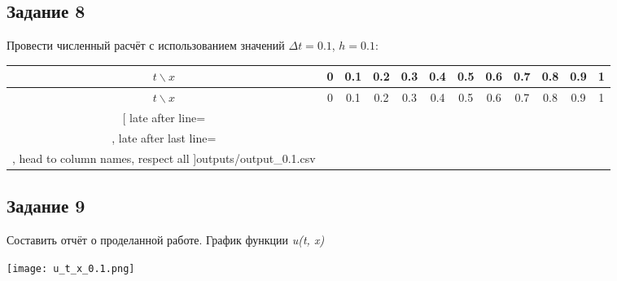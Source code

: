 \documentclass[12pt, a4paper]{report}
\begin{document}
	\subsection*{Задание 8}
	\large
	Провести численный расчёт с использованием значений $ \Delta t = 0.1$, $ h = 0.1 $:
		\begin{center}
	\small
	\label{tab:results_01}
		\begin{longtable}{|c|c|c|c|c|c|c|c|c|c|c|c|}
		\hline
		$t \backslash x$ & 0 & 0.1 & 0.2 & 0.3 & 0.4 & 0.5 & 0.6 & 0.7 & 0.8 & 0.9 & 1 \\\hline
		\endfirsthead

		\hline
		$t \backslash x$ & 0 & 0.1 & 0.2 & 0.3 & 0.4 & 0.5 & 0.6 & 0.7 & 0.8 & 0.9 & 1 \\\hline
		\endhead

		\hline
		\endfoot

		\csvreader[
		  late after line=\\,
		  late after last line=\\\hline,
		  head to column names,
		  respect all
		]{outputs/output_0.1.csv}{}{
		  \csvcoli & \csvcolii & \csvcoliii & \csvcoliv & \csvcolv & \csvcolvi & \csvcolvii & \csvcolviii & \csvcolix & \csvcolx & \csvcolxi & \csvcolxii
		}
		\end{longtable}
	\end{center}

	\subsection*{Задание 9}
	\large
	Составить отчёт о проделанной работе. График функции \textit{u(t, x)}
	\begin{center}
		\texttt{[image: u\_t\_x\_0.1.png]}
	\end{center}
\end{document}
